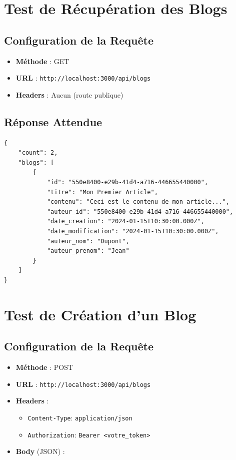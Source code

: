 \section{Test de Récupération des Blogs}

\subsection{Configuration de la Requête}

\begin{itemize}
    \item \textbf{Méthode} : GET
    \item \textbf{URL} : \texttt{http://localhost:3000/api/blogs}
    \item \textbf{Headers} : Aucun (route publique)
\end{itemize}

\subsection{Réponse Attendue}

\begin{lstlisting}[style=javascript]
{
    "count": 2,
    "blogs": [
        {
            "id": "550e8400-e29b-41d4-a716-446655440000",
            "titre": "Mon Premier Article",
            "contenu": "Ceci est le contenu de mon article...",
            "auteur_id": "550e8400-e29b-41d4-a716-446655440000",
            "date_creation": "2024-01-15T10:30:00.000Z",
            "date_modification": "2024-01-15T10:30:00.000Z",
            "auteur_nom": "Dupont",
            "auteur_prenom": "Jean"
        }
    ]
}
\end{lstlisting}

\section{Test de Création d'un Blog}

\subsection{Configuration de la Requête}

\begin{itemize}
    \item \textbf{Méthode} : POST
    \item \textbf{URL} : \texttt{http://localhost:3000/api/blogs}
    \item \textbf{Headers} :
        \begin{itemize}
            \item \texttt{Content-Type}: \texttt{application/json}
            \item \texttt{Authorization}: \texttt{Bearer <votre\_token>}
        \end{itemize}
    \item \textbf{Body} (JSON) :
\end{itemize}

